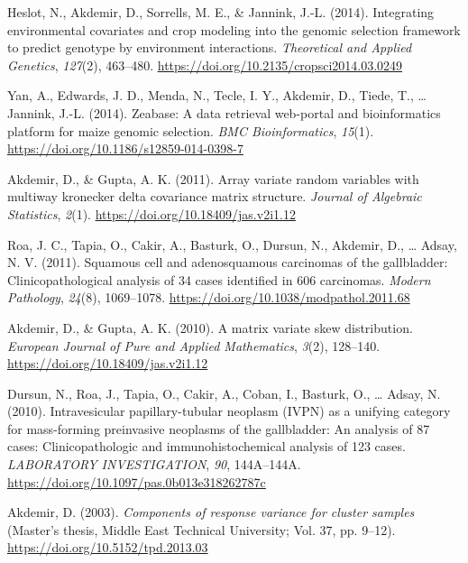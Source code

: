 \documentclass[11pt,a4paper,]{moderncv}
\newlength{\cslhangindent}
\newenvironment{CSLReferences}[2] %
 {\begin{list}{}{%
  \setlength{\itemindent}{0pt}
  \setlength{\leftmargin}{0pt}
  \setlength{\parsep}{0pt}
  \ifodd #1
   \setlength{\leftmargin}{\cslhangindent}
   \setlength{\itemindent}{-1\cslhangindent}
  \fi
  \setlength{\itemsep}{#2\baselineskip}}}
 {\end{list}}
\begin{document}
\begin{CSLReferences}{1}{0}
Heslot, N., Akdemir, D., Sorrells, M. E., \& Jannink, J.-L. (2014).
Integrating environmental covariates and crop modeling into the genomic
selection framework to predict genotype by environment interactions.
\emph{Theoretical and Applied Genetics}, \emph{127}(2), 463--480.
\url{https://doi.org/10.2135/cropsci2014.03.0249}

Yan, A., Edwards, J. D., Menda, N., Tecle, I. Y., Akdemir, D., Tiede,
T., \ldots{} Jannink, J.-L. (2014). Zeabase: A data retrieval web-portal
and bioinformatics platform for maize genomic selection. \emph{BMC
Bioinformatics}, \emph{15}(1).
\url{https://doi.org/10.1186/s12859-014-0398-7}

Akdemir, D., \& Gupta, A. K. (2011). Array variate random variables with
multiway kronecker delta covariance matrix structure. \emph{Journal of
Algebraic Statistics}, \emph{2}(1).
\url{https://doi.org/10.18409/jas.v2i1.12}

Roa, J. C., Tapia, O., Cakir, A., Basturk, O., Dursun, N., Akdemir, D.,
\ldots{} Adsay, N. V. (2011). Squamous cell and adenosquamous carcinomas
of the gallbladder: Clinicopathological analysis of 34 cases identified
in 606 carcinomas. \emph{Modern Pathology}, \emph{24}(8), 1069--1078.
\url{https://doi.org/10.1038/modpathol.2011.68}

Akdemir, D., \& Gupta, A. K. (2010). A matrix variate skew distribution.
\emph{European Journal of Pure and Applied Mathematics}, \emph{3}(2),
128--140. \url{https://doi.org/10.18409/jas.v2i1.12}

Dursun, N., Roa, J., Tapia, O., Cakir, A., Coban, I., Basturk, O.,
\ldots{} Adsay, N. (2010). Intravesicular papillary-tubular neoplasm
(IVPN) as a unifying category for mass-forming preinvasive neoplasms of
the gallbladder: An analysis of 87 cases: Clinicopathologic and
immunohistochemical analysis of 123 cases. \emph{LABORATORY
INVESTIGATION}, \emph{90}, 144A--144A.
\url{https://doi.org/10.1097/pas.0b013e318262787c}

Akdemir, D. (2003). \emph{Components of response variance for cluster
samples} (Master's thesis, Middle East Technical University; Vol. 37,
pp. 9--12). \url{https://doi.org/10.5152/tpd.2013.03}

\end{CSLReferences}
\end{document}
